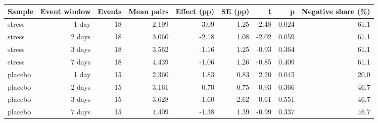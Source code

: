 \begin{tabular}{lrrrrrrrr}
\toprule
Sample & Event window & Events & Mean pairs & Effect (pp) & SE (pp) & t & p & Negative share (\%) \\
\midrule
stress & 1 day & 18 & 2,199 & -3.09 & 1.25 & -2.48 & 0.024 & 61.1 \\
stress & 2 days & 18 & 3,060 & -2.18 & 1.08 & -2.02 & 0.059 & 61.1 \\
stress & 3 days & 18 & 3,562 & -1.16 & 1.25 & -0.93 & 0.364 & 61.1 \\
stress & 7 days & 18 & 4,439 & -1.06 & 1.26 & -0.85 & 0.409 & 61.1 \\
placebo & 1 day & 15 & 2,360 & 1.83 & 0.83 & 2.20 & 0.045 & 20.0 \\
placebo & 2 days & 15 & 3,161 & 0.70 & 0.75 & 0.93 & 0.366 & 46.7 \\
placebo & 3 days & 15 & 3,628 & -1.60 & 2.62 & -0.61 & 0.551 & 46.7 \\
placebo & 7 days & 15 & 4,409 & -1.38 & 1.39 & -0.99 & 0.337 & 46.7 \\
\bottomrule
\end{tabular}
